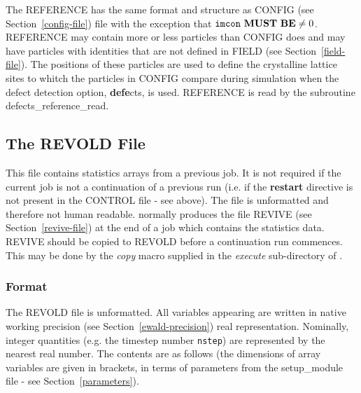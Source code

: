 The REFERENCE has the same format and structure as CONFIG
(see Section~\ref{config-file}) file with the exception that
${\tt imcon}~{\bf MUST~BE} \ne 0$.  REFERENCE may contain
more or less particles than CONFIG does and may have
particles with identities that are not defined in FIELD
(see Section~\ref{field-file}).  The positions of these
particles are used to define the crystalline lattice sites
to whitch the particles in CONFIG compare during simulation
when the defect detection option, {\bf defe}cts, is used.
REFERENCE is read by the subroutine {\sc defects\_reference\_read}.

\subsection{The REVOLD File}
\label{revold-file}

This file contains statistics arrays from a previous job.  It is
not required if the current job is not a continuation of a
previous run (i.e. if the {\bf restart} directive is not present
in the CONTROL file - see above).  The file is unformatted and
therefore not human readable.  \D normally produces the file
REVIVE (see Section~\ref{revive-file}) at the end of a job which
contains the statistics data.  REVIVE should be copied to REVOLD
before a continuation run commences.  This may be done by the {\sl
copy} macro supplied in the {\em execute} sub-directory of \D.

\subsubsection{Format}

The REVOLD file is unformatted.  All variables appearing are
written in native working precision (see Section~\ref{ewald-precision})
real representation. Nominally, integer quantities (e.g. the
timestep number {\tt nstep}) are represented by the nearest
real number.  The contents are as follows (the dimensions of
array variables are given in brackets, in terms of parameters
from the {\sc setup\_module} file - see Section~\ref{parameters}).

